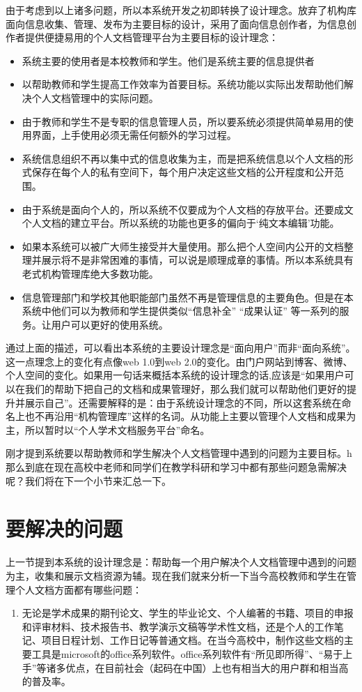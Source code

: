 由于考虑到以上诸多问题，所以本系统开发之初即转换了设计理念。放弃了机构库面向信息收集、管理、发布为主要目标的设计，采用了面向信息创作者，为信息创作者提供便捷易用的个人文档管理平台为主要目标的设计理念：
\begin{itemize}
\item 系统主要的使用者是本校教师和学生。他们是系统主要的信息提供者
\item 以帮助教师和学生提高工作效率为首要目标。系统功能以实际出发帮助他们解决个人文档管理中的实际问题。
\item 由于教师和学生不是专职的信息管理人员，所以要系统必须提供简单易用的使用界面，上手使用必须无需任何额外的学习过程。
\item 系统信息组织不再以集中式的信息收集为主，而是把系统信息以个人文档的形式保存在每个人的私有空间下，每个用户决定这些文档的公开程度和公开范围。
\item 由于系统是面向个人的，所以系统不仅要成为个人文档的存放平台。还要成文个人文档的建立平台。所以系统的功能也更多的偏向于‘纯文本编辑’功能。
\item 如果本系统可以被广大师生接受并大量使用。那么把个人空间内公开的文档整理并展示将不是非常困难的事情，可以说是顺理成章的事情。所以本系统具有老式机构管理库绝大多数功能。
\item 信息管理部门和学校其他职能部门虽然不再是管理信息的主要角色。但是在本系统中他们可以为教师和学生提供类似“信息补全” “成果认证” 等一系列的服务。让用户可以更好的使用系统。
\end{itemize}
通过上面的描述，可以看出本系统的主要设计理念是“面向用户”而非“面向系统”。这一点理念上的变化有点像web 1.0到web 2.0的变化。由门户网站到博客、微博、个人空间的变化。如果用一句话来概括本系统的设计理念的话,应该是“如果用户可以在我们的帮助下把自己的文档和成果管理好，那么我们就可以帮助他们更好的提升并展示自己”。还需要解释的是：由于系统设计理念的不同，所以这套系统在命名上也不再沿用“机构管理库”这样的名词。从功能上主要以管理个人文档和成果为主，所以暂时以“个人学术文档服务平台”命名。

刚才提到系统要以帮助教师和学生解决个人文档管理中遇到的问题为主要目标。h那么到底在现在高校中老师和同学们在教学科研和学习中都有那些问题急需解决呢？我们将在下一个小节来汇总一下。

\section{要解决的问题}
\label{sec:question}

上一节提到本系统的设计理念是：帮助每一个用户解决个人文档管理中遇到的问题为主，收集和展示文档资源为辅。现在我们就来分析一下当今高校教师和学生在管理个人文档方面都有哪些问题：
\begin{enumerate}
\item 无论是学术成果的期刊论文、学生的毕业论文、个人编著的书籍、项目的申报和评审材料、技术报告书、教学演示文稿等学术性文档，还是个人的工作笔记、项目日程计划、工作日记等普通文档。在当今高校中，制作这些文档的主要工具是microsoft的office系列软件。office系列软件有“所见即所得”、“易于上手”等诸多优点，在目前社会（起码在中国）上也有相当大的用户群和相当高的普及率。
\end{enumerate}